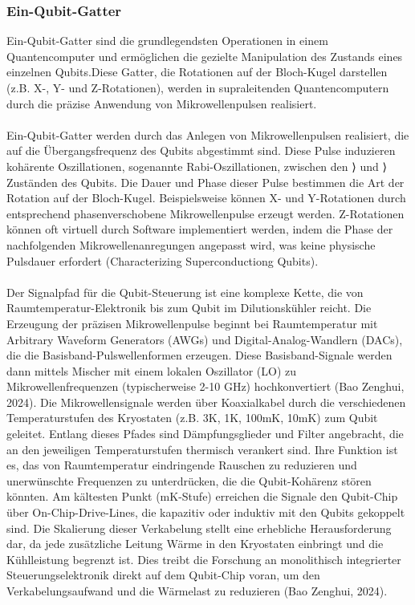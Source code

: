 \subsubsection{Ein-Qubit-Gatter}
Ein-Qubit-Gatter sind die grundlegendsten Operationen in einem Quantencomputer und ermöglichen die gezielte Manipulation des Zustands eines einzelnen Qubits.Diese Gatter, die Rotationen auf der Bloch-Kugel darstellen (z.B. X-, Y- und Z-Rotationen), werden in supraleitenden Quantencomputern durch die präzise Anwendung von Mikrowellenpulsen realisiert.
\\\\
Ein-Qubit-Gatter werden durch das Anlegen von Mikrowellenpulsen realisiert, die auf die Übergangsfrequenz des Qubits abgestimmt sind. Diese Pulse induzieren kohärente Oszillationen, sogenannte Rabi-Oszillationen, zwischen den \big {}⟩ und \big {}⟩ Zuständen des Qubits. Die Dauer und Phase dieser Pulse bestimmen die Art der Rotation auf der Bloch-Kugel. Beispielsweise können X- und Y-Rotationen durch entsprechend phasenverschobene Mikrowellenpulse erzeugt werden. Z-Rotationen können oft virtuell durch Software implementiert werden, indem die Phase der nachfolgenden Mikrowellenanregungen angepasst wird, was keine physische Pulsdauer erfordert (Characterizing Superconductiong Qubits).\\\\Der Signalpfad für die Qubit-Steuerung ist eine komplexe Kette, die von Raumtemperatur-Elektronik bis zum Qubit im Dilutionskühler reicht. Die Erzeugung der präzisen Mikrowellenpulse beginnt bei Raumtemperatur mit Arbitrary Waveform Generators (AWGs) und Digital-Analog-Wandlern (DACs), die die Basisband-Pulswellenformen erzeugen. Diese Basisband-Signale werden dann mittels Mischer mit einem lokalen Oszillator (LO) zu Mikrowellenfrequenzen (typischerweise 2-10 GHz) hochkonvertiert (Bao Zenghui, 2024). Die Mikrowellensignale werden über Koaxialkabel durch die verschiedenen Temperaturstufen des Kryostaten (z.B. 3K, 1K, 100mK, 10mK) zum Qubit geleitet. Entlang dieses Pfades sind Dämpfungsglieder und Filter angebracht, die an den jeweiligen Temperaturstufen thermisch verankert sind. Ihre Funktion ist es, das von Raumtemperatur eindringende Rauschen zu reduzieren und unerwünschte Frequenzen zu unterdrücken, die die Qubit-Kohärenz stören könnten. Am kältesten Punkt (mK-Stufe) erreichen die Signale den Qubit-Chip über On-Chip-Drive-Lines, die kapazitiv oder induktiv mit den Qubits gekoppelt sind. Die Skalierung dieser Verkabelung stellt eine erhebliche Herausforderung dar, da jede zusätzliche Leitung Wärme in den Kryostaten einbringt und die Kühlleistung begrenzt ist. Dies treibt die Forschung an monolithisch integrierter Steuerungselektronik direkt auf dem Qubit-Chip voran, um den Verkabelungsaufwand und die Wärmelast zu reduzieren (Bao Zenghui, 2024).

